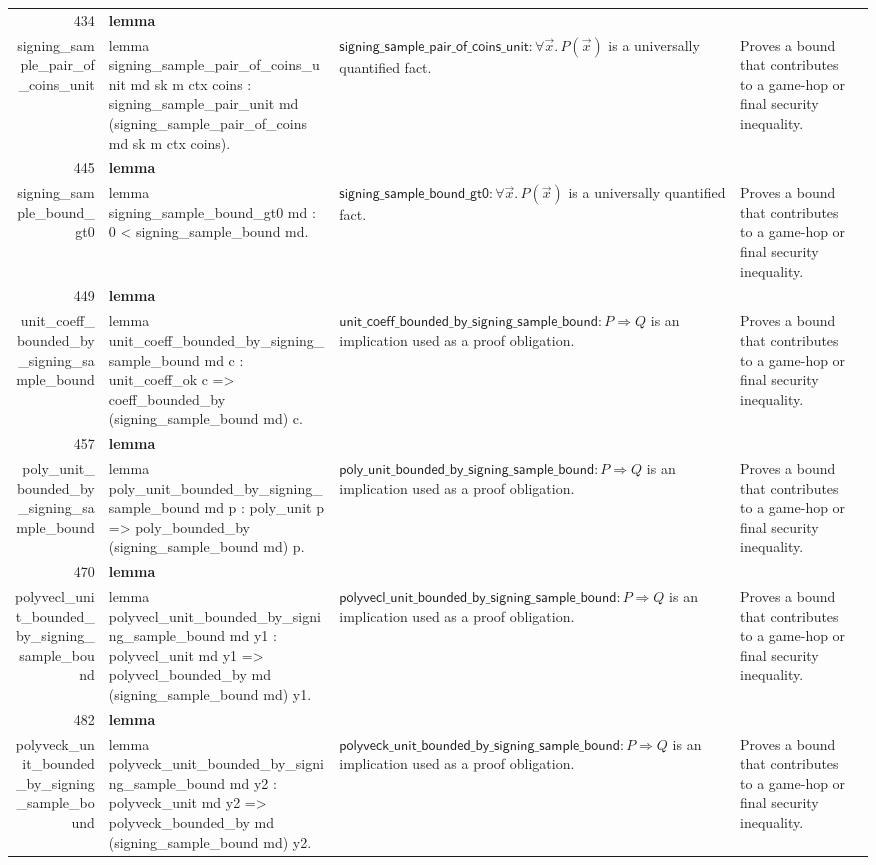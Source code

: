 \documentclass[10pt]{article}
\newcommand{\ec}[1]{\begingroup\ttfamily\scriptsize #1\endgroup}
\begin{document}
\begin{longtable}{r L{0.17\textwidth} L{0.26\textwidth} L{0.27\textwidth} L{0.20\textwidth}}
434 & \textbf{lemma}\\\ec{signing\_sample\_pair\_of\_coins\_unit} & \ec{lemma signing\_sample\_pair\_of\_coins\_unit md sk m ctx coins : signing\_sample\_pair\_unit md (signing\_sample\_pair\_of\_coins md sk m ctx coins).} & \(\mathsf{signing\_sample\_pair\_of\_coins\_unit} : \forall \vec{x}.\, P(\vec{x})\) is a universally quantified fact. & Proves a bound that contributes to a game-hop or final security inequality. \\
445 & \textbf{lemma}\\\ec{signing\_sample\_bound\_gt0} & \ec{lemma signing\_sample\_bound\_gt0 md : 0 < signing\_sample\_bound md.} & \(\mathsf{signing\_sample\_bound\_gt0} : \forall \vec{x}.\, P(\vec{x})\) is a universally quantified fact. & Proves a bound that contributes to a game-hop or final security inequality. \\
449 & \textbf{lemma}\\\ec{unit\_coeff\_bounded\_by\_signing\_sample\_bound} & \ec{lemma unit\_coeff\_bounded\_by\_signing\_sample\_bound md c : unit\_coeff\_ok c => coeff\_bounded\_by (signing\_sample\_bound md) c.} & \(\mathsf{unit\_coeff\_bounded\_by\_signing\_sample\_bound} : P \Rightarrow Q\) is an implication used as a proof obligation. & Proves a bound that contributes to a game-hop or final security inequality. \\
457 & \textbf{lemma}\\\ec{poly\_unit\_bounded\_by\_signing\_sample\_bound} & \ec{lemma poly\_unit\_bounded\_by\_signing\_sample\_bound md p : poly\_unit p => poly\_bounded\_by (signing\_sample\_bound md) p.} & \(\mathsf{poly\_unit\_bounded\_by\_signing\_sample\_bound} : P \Rightarrow Q\) is an implication used as a proof obligation. & Proves a bound that contributes to a game-hop or final security inequality. \\
470 & \textbf{lemma}\\\ec{polyvecl\_unit\_bounded\_by\_signing\_sample\_bound} & \ec{lemma polyvecl\_unit\_bounded\_by\_signing\_sample\_bound md y1 : polyvecl\_unit md y1 => polyvecl\_bounded\_by md (signing\_sample\_bound md) y1.} & \(\mathsf{polyvecl\_unit\_bounded\_by\_signing\_sample\_bound} : P \Rightarrow Q\) is an implication used as a proof obligation. & Proves a bound that contributes to a game-hop or final security inequality. \\
482 & \textbf{lemma}\\\ec{polyveck\_unit\_bounded\_by\_signing\_sample\_bound} & \ec{lemma polyveck\_unit\_bounded\_by\_signing\_sample\_bound md y2 : polyveck\_unit md y2 => polyveck\_bounded\_by md (signing\_sample\_bound md) y2.} & \(\mathsf{polyveck\_unit\_bounded\_by\_signing\_sample\_bound} : P \Rightarrow Q\) is an implication used as a proof obligation. & Proves a bound that contributes to a game-hop or final security inequality. \\

\end{longtable}
\end{document}
